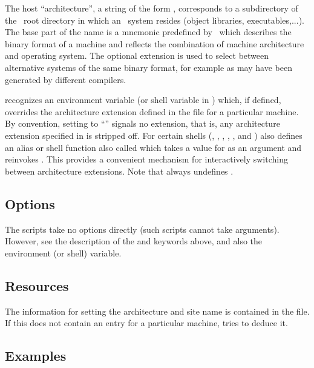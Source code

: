 The host ``architecture'', a string of the form ,
corresponds to a subdirectory of the \aipspp\ root directory in which an
\aipspp\ system resides (object libraries, executables,...).  The base part of
the name is a mnemonic predefined by \aipspp\ which describes the binary
format of a machine and reflects the combination of machine architecture and
operating system.  The optional extension is used to select between
alternative systems of the same binary format, for example as may have been
generated by different compilers.

 recognizes an environment variable (or shell variable in
)  which, if defined, overrides the
architecture extension defined in the  file for a particular
machine.  By convention, setting  to ``\code{\_}'' signals no
extension, that is, any architecture extension specified in 
is stripped off.  For certain shells (, ,
, , , and ) 
also defines an alias or shell function also called  which takes
a value for  as an argument and reinvokes .
This provides a convenient mechanism for interactively switching between
architecture extensions.  Note that  always undefines
.


\subsection*{Options}

The  scripts take no options directly (such scripts cannot take
arguments).  However, see the description of the  and
 keywords above, and also the  environment (or
shell) variable.


\subsection*{Resources}

The information for setting the architecture and site name is contained in the
 file.  If this does not contain an entry for a particular
machine,  tries to deduce it.

\subsection*{Examples}


